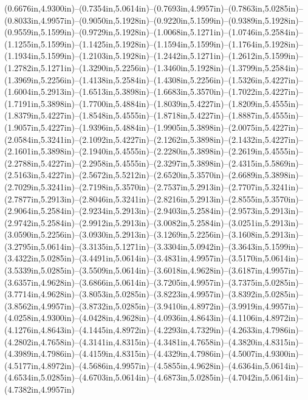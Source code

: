 (0.6676in,4.9300in)--(0.7354in,5.0614in)--(0.7693in,4.9957in)--(0.7863in,5.0285in)--(0.8033in,4.9957in)--(0.9050in,5.1928in)--(0.9220in,5.1599in)--(0.9389in,5.1928in)--(0.9559in,5.1599in)--(0.9729in,5.1928in)--(1.0068in,5.1271in)--(1.0746in,5.2584in)--(1.1255in,5.1599in)--(1.1425in,5.1928in)--(1.1594in,5.1599in)--(1.1764in,5.1928in)--(1.1934in,5.1599in)--(1.2103in,5.1928in)--(1.2442in,5.1271in)--(1.2612in,5.1599in)--(1.2782in,5.1271in)--(1.3290in,5.2256in)--(1.3460in,5.1928in)--(1.3799in,5.2584in)--(1.3969in,5.2256in)--(1.4138in,5.2584in)--(1.4308in,5.2256in)--(1.5326in,5.4227in)--(1.6004in,5.2913in)--(1.6513in,5.3898in)--(1.6683in,5.3570in)--(1.7022in,5.4227in)--(1.7191in,5.3898in)--(1.7700in,5.4884in)--(1.8039in,5.4227in)--(1.8209in,5.4555in)--(1.8379in,5.4227in)--(1.8548in,5.4555in)--(1.8718in,5.4227in)--(1.8887in,5.4555in)--(1.9057in,5.4227in)--(1.9396in,5.4884in)--(1.9905in,5.3898in)--(2.0075in,5.4227in)--(2.0584in,5.3241in)--(2.1092in,5.4227in)--(2.1262in,5.3898in)--(2.1432in,5.4227in)--(2.1601in,5.3898in)--(2.1940in,5.4555in)--(2.2280in,5.3898in)--(2.2619in,5.4555in)--(2.2788in,5.4227in)--(2.2958in,5.4555in)--(2.3297in,5.3898in)--(2.4315in,5.5869in)--(2.5163in,5.4227in)--(2.5672in,5.5212in)--(2.6520in,5.3570in)--(2.6689in,5.3898in)--(2.7029in,5.3241in)--(2.7198in,5.3570in)--(2.7537in,5.2913in)--(2.7707in,5.3241in)--(2.7877in,5.2913in)--(2.8046in,5.3241in)--(2.8216in,5.2913in)--(2.8555in,5.3570in)--(2.9064in,5.2584in)--(2.9234in,5.2913in)--(2.9403in,5.2584in)--(2.9573in,5.2913in)--(2.9742in,5.2584in)--(2.9912in,5.2913in)--(3.0082in,5.2584in)--(3.0251in,5.2913in)--(3.0590in,5.2256in)--(3.0930in,5.2913in)--(3.1269in,5.2256in)--(3.1608in,5.2913in)--(3.2795in,5.0614in)--(3.3135in,5.1271in)--(3.3304in,5.0942in)--(3.3643in,5.1599in)--(3.4322in,5.0285in)--(3.4491in,5.0614in)--(3.4831in,4.9957in)--(3.5170in,5.0614in)--(3.5339in,5.0285in)--(3.5509in,5.0614in)--(3.6018in,4.9628in)--(3.6187in,4.9957in)--(3.6357in,4.9628in)--(3.6866in,5.0614in)--(3.7205in,4.9957in)--(3.7375in,5.0285in)--(3.7714in,4.9628in)--(3.8053in,5.0285in)--(3.8223in,4.9957in)--(3.8392in,5.0285in)--(3.8562in,4.9957in)--(3.8732in,5.0285in)--(3.9410in,4.8972in)--(3.9919in,4.9957in)--(4.0258in,4.9300in)--(4.0428in,4.9628in)--(4.0936in,4.8643in)--(4.1106in,4.8972in)--(4.1276in,4.8643in)--(4.1445in,4.8972in)--(4.2293in,4.7329in)--(4.2633in,4.7986in)--(4.2802in,4.7658in)--(4.3141in,4.8315in)--(4.3481in,4.7658in)--(4.3820in,4.8315in)--(4.3989in,4.7986in)--(4.4159in,4.8315in)--(4.4329in,4.7986in)--(4.5007in,4.9300in)--(4.5177in,4.8972in)--(4.5686in,4.9957in)--(4.5855in,4.9628in)--(4.6364in,5.0614in)--(4.6534in,5.0285in)--(4.6703in,5.0614in)--(4.6873in,5.0285in)--(4.7042in,5.0614in)--(4.7382in,4.9957in)
